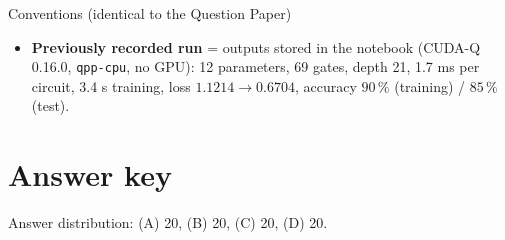 \documentclass[11pt,a4paper]{article}
\begin{document}
\begin{infobox}{Conventions (identical to the Question Paper)}
\begin{itemize}[leftmargin=1.2em, itemsep=1pt, topsep=2pt]
      noise in $[0, 0.25]$, 20 training / 20 test images, \texttt{SEED = 42}; one qubit per pixel; encoding $R_Y(\pi x_i)$. QCNN
      layer $\ell = 1, 2, \dots$ has 4 shared parameters $\theta_{\ell,1..4}$ = \texttt{theta[4($\ell$-1)]}\,\dots\,\texttt{theta[4($\ell$-1)+3]}:
      convolution block $= \mathrm{CNOT}_{a\to b}\big(R_Y(\theta_{\ell,1})_a\otimes R_Y(\theta_{\ell,2})_b\big)$ on pairs $(0,1), (2,3), \dots$ then $(1,2), (3,4), \dots$;
      pooling block (source $a$, sink $b$) $= \ket1\!\bra1_a\otimes R_Z(\theta_{\ell,3}) + \ket0\!\bra0_a\otimes R_X(\theta_{\ell,4})$, then $a$ is discarded.
      Readout $\langle Z_{\text{out}}\rangle$ with \texttt{cudaq.observe} (exact); MSE loss; COBYLA with 100 loss evaluations.
\item \textbf{Previously recorded run} = outputs stored in the notebook (CUDA-Q 0.16.0, \texttt{qpp-cpu}, no GPU): 12 parameters, 69 gates,
      depth 21, 1.7 ms per circuit, 3.4 s training, loss $1.1214 \to 0.6704$, accuracy $90\,\%$ (training) / $85\,\%$ (test).
\end{itemize}
\end{infobox}
\newpage
\section*{Answer key}\label{key}
{\small Answer distribution: (A) 20, (B) 20, (C) 20, (D) 20.}

\end{document}
